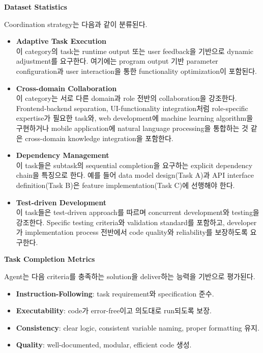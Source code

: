 \textbf{Dataset Statistics}

Coordination strategy는 다음과 같이 분류된다.

\begin{itemize}
    \item \textbf{Adaptive Task Execution}\\
    이 category의 task는 runtime output 또는 user feedback을 기반으로 dynamic adjustment를 요구한다. 여기에는 program output 기반 parameter configuration과 user interaction을 통한 functionality optimization이 포함된다.

    \item \textbf{Cross-domain Collaboration}\\
    이 category는 서로 다른 domain과 role 전반의 collaboration을 강조한다. Frontend-backend separation, UI-functionality integration처럼 role-specific expertise가 필요한 task와, web development에 machine learning algorithm을 구현하거나 mobile application에 natural language processing을 통합하는 것 같은 cross-domain knowledge integration을 포함한다.

    \item \textbf{Dependency Management}\\
    이 task들은 subtask의 sequential completion을 요구하는 explicit dependency chain을 특징으로 한다. 예를 들어 data model design(Task A)과 API interface definition(Task B)은 feature implementation(Task C)에 선행해야 한다.

    \item \textbf{Test-driven Development}\\
    이 task들은 test-driven approach를 따르며 concurrent development와 testing을 강조한다. Specific testing criteria와 validation standard를 포함하고, developer가 implementation process 전반에서 code quality와 reliability를 보장하도록 요구한다.
\end{itemize}




\textbf{Task Completion Metrics}

Agent는 다음 criteria를 충족하는 solution을 deliver하는 능력을 기반으로 평가된다.

\begin{itemize}
    \item \textbf{Instruction-Following}: task requirement와 specification 준수.
    \item \textbf{Executability}: code가 error-free이고 의도대로 run되도록 보장.
    \item \textbf{Consistency}: clear logic, consistent variable naming, proper formatting 유지.
    \item \textbf{Quality}: well-documented, modular, efficient code 생성.
\end{itemize}


